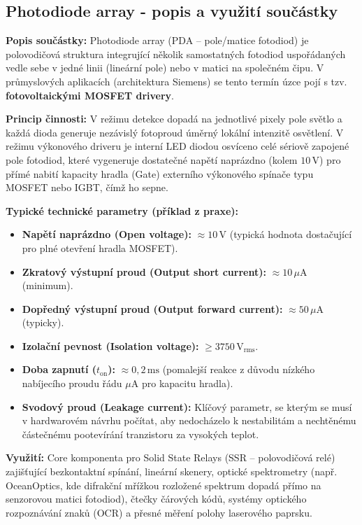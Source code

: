 \documentclass[a4paper, 12pt]{article}
\begin{document}
        \subsection{Photodiode array - popis a využití součástky}
        \textbf{Popis součástky:} Photodiode array (PDA – pole/matice fotodiod) je polovodičová struktura integrující několik samostatných fotodiod uspořádaných vedle sebe v jedné linii (lineární pole) nebo v matici na společném čipu. V průmyslových aplikacích (architektura Siemens) se tento termín úzce pojí s tzv. \textbf{fotovoltaickými MOSFET drivery}.

        \textbf{Princip činnosti:}
        V režimu detekce dopadá na jednotlivé pixely pole světlo a každá dioda generuje nezávislý fotoproud úměrný lokální intenzitě osvětlení. V režimu výkonového driveru je interní LED diodou osvíceno celé sériově zapojené pole fotodiod, které vygeneruje dostatečné napětí naprázdno (kolem $10\,\text{V}$) pro přímé nabití kapacity hradla (Gate) externího výkonového spínače typu MOSFET nebo IGBT, čímž ho sepne.

        \textbf{Typické technické parametry (příklad z praxe):}
        \begin{itemize}
            \item \textbf{Napětí naprázdno (Open voltage):} $\approx 10\,\text{V}$ (typická hodnota dostačující pro plné otevření hradla MOSFET).
            \item \textbf{Zkratový výstupní proud (Output short current):} $\approx 10\,\mu\text{A}$ (minimum).
            \item \textbf{Dopředný výstupní proud (Output forward current):} $\approx 50\,\mu\text{A}$ (typicky).
            \item \textbf{Izolační pevnost (Isolation voltage):} $\ge 3750\,\text{V}_{\text{rms}}$.
            \item \textbf{Doba zapnutí ($t_{\text{on}}$):} $\approx 0{,}2\,\text{ms}$ (pomalejší reakce z důvodu nízkého nabíjecího proudu řádu $\mu\text{A}$ pro kapacitu hradla).
            \item \textbf{Svodový proud (Leakage current):} Klíčový parametr, se kterým se musí v hardwarovém návrhu počítat, aby nedocházelo k nestabilitám a nechtěnému částečnému pootevírání tranzistoru za vysokých teplot.
        \end{itemize}
        \textbf{Využití:} Core komponenta pro Solid State Relays (SSR – polovodičová relé) zajišťující bezkontaktní spínání, lineární skenery, optické spektrometry (např. OceanOptics, kde difrakční mřížkou rozložené spektrum dopadá přímo na senzorovou matici fotodiod), čtečky čárových kódů, systémy optického rozpoznávání znaků (OCR) a přesné měření polohy laserového paprsku.
\end{document}

